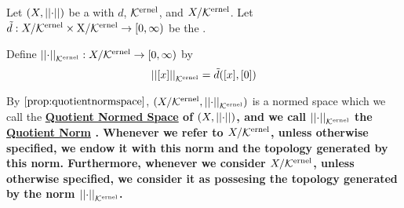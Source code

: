 \label{def:quotientnormspace}
\newcommand{\QuotientNorm}[0]{
    \bf \hyperref[def:quotientnormspace]{Quotient Norm} \rm
}
\newcommand{\QuotientNormedSpace}[0]{
    \bf \hyperref[def:quotientnormspace]{Quotient Normed Space} \rm
}

\begin{df}
Let $(X,\left|\left| \cdot \right|\right|)$ be a \SeminormedSpace
with \SeminormInducedPseudometric $d$, 
\SeminormKernel $\bf\mathcal{K}\rm^{ernel}$, and
\SeminormKernelQuotientVectorSpace $X/\bf\mathcal{K}\rm^{ernel}$.
Let $\tilde{d}:X/\bf\mathcal{K}\rm^{ernel} \times X/\bf\mathcal{K}\rm^{ernel} \to [0,\infty)$ be the \MetricInducedByPseudometric.

Define $\left|\left| \cdot \right|\right|_{\bf\mathcal{K}\rm^{ernel}} : X/\bf\mathcal{K}\rm^{ernel} \to [0,\infty)$ by 
\begin{equation}
\left|\left| [x] \right|\right|_{\bf\mathcal{K}\rm^{ernel}} = \tilde{d}([x], [0])
\end{equation}

By $\ref{prop:quotientnormspace}$, $(X/\bf\mathcal{K}\rm^{ernel}, \left|\left| \cdot \right|\right|_{\bf\mathcal{K}\rm^{ernel}})$ is a normed space which we call the \QuotientNormedSpace of $(X,\left|\left| \cdot \right|\right|)$, and we call $\left|\left| \cdot \right|\right|_{\bf\mathcal{K}\rm^{ernel}}$ the \QuotientNorm. 
Whenever we refer to $X/\bf\mathcal{K}\rm^{ernel}$, unless otherwise specified, we endow it with this norm and the topology generated by this norm.
Furthermore, whenever we consider $X/\bf\mathcal{K}\rm^{ernel}$, unless otherwise specified, we consider it as 
possesing the topology generated by the norm $\left|\left| \cdot \right|\right|_{\bf\mathcal{K}\rm^{ernel}}$. 
\end{df}
